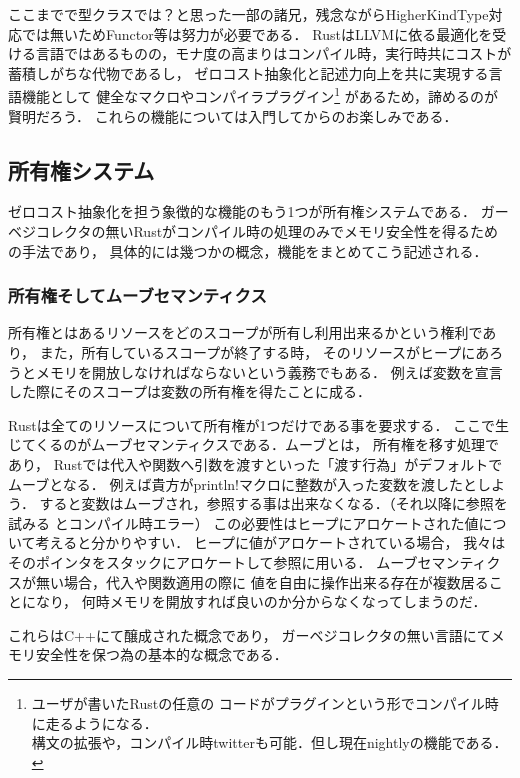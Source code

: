 ここまでで型クラスでは？と思った一部の諸兄，残念ながらHigherKindType対応では無いためFunctor等は努力が必要である．
RustはLLVMに依る最適化を受ける言語ではあるものの，モナ度の高まりはコンパイル時，実行時共にコストが蓄積しがちな代物であるし，
ゼロコスト抽象化と記述力向上を共に実現する言語機能として
健全なマクロやコンパイラプラグイン\footnote{ユーザが書いたRustの任意の
  コードがプラグインという形でコンパイル時に走るようになる． \\
  構文の拡張や，コンパイル時twitterも可能．但し現在nightlyの機能である．}
があるため，諦めるのが賢明だろう．
これらの機能については入門してからのお楽しみである．


\subsection{所有権システム}
ゼロコスト抽象化を担う象徴的な機能のもう1つが所有権システムである．
ガーベジコレクタの無いRustがコンパイル時の処理のみでメモリ安全性を得るための手法であり，
具体的には幾つかの概念，機能をまとめてこう記述される．

\subsubsection{所有権そしてムーブセマンティクス}
所有権とはあるリソースをどのスコープが所有し利用出来るかという権利であり，
また，所有しているスコープが終了する時，
そのリソースがヒープにあろうとメモリを開放しなければならないという義務でもある．
例えば変数を宣言した際にそのスコープは変数の所有権を得たことに成る．

Rustは全てのリソースについて所有権が1つだけである事を要求する．
ここで生じてくるのがムーブセマンティクスである．ムーブとは，
所有権を移す処理であり，
Rustでは代入や関数へ引数を渡すといった「渡す行為」がデフォルトでムーブとなる．
例えば貴方がprintln!マクロに整数が入った変数を渡したとしよう．
すると変数はムーブされ，参照する事は出来なくなる．（それ以降に参照を試みる
とコンパイル時エラー）
この必要性はヒープにアロケートされた値について考えると分かりやすい．
ヒープに値がアロケートされている場合，
我々はそのポインタをスタックにアロケートして参照に用いる．
ムーブセマンティクスが無い場合，代入や関数適用の際に
値を自由に操作出来る存在が複数居ることになり，
何時メモリを開放すれば良いのか分からなくなってしまうのだ．

これらはC++にて醸成された概念であり，
ガーベジコレクタの無い言語にてメモリ安全性を保つ為の基本的な概念である．

